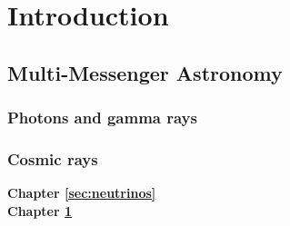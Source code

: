 %
\chapter{Introduction}
\label{sec:intro}



\section{Multi-Messenger Astronomy}
\label{sec:intro:multimessenger}



\subsection{Photons and gamma rays}
\label{sec:intro:gammarays}


\subsection{Cosmic rays}
\label{sec:intro:cosmicrays}


\textbf{Chapter \ref{sec:neutrinos}} \\[0.2em]

\textbf{Chapter \ref{sec:intro}} \\[0.2em]

